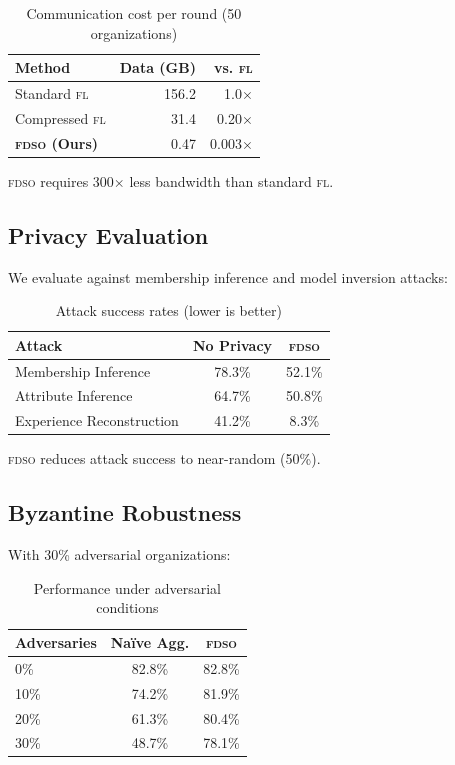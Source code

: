 \documentclass[11pt,letterpaper]{article}
\newcommand{\FDSO}{\textsc{fdso}}
\newcommand{\FL}{\textsc{fl}}
\begin{document}
\begin{table}[h]
\centering
\caption{Communication cost per round (50 organizations)}
\label{tab:communication}
\begin{tabular}{lrr}
\toprule
\textbf{Method} & \textbf{Data (GB)} & \textbf{vs. \FL{}} \\
\midrule
Standard \FL{} & 156.2 & 1.0$\times$ \\
Compressed \FL{} & 31.4 & 0.20$\times$ \\
\textbf{\FDSO{} (Ours)} & 0.47 & 0.003$\times$ \\
\bottomrule
\end{tabular}
\end{table}

\FDSO{} requires 300$\times$ less bandwidth than standard \FL{}.

\subsection{Privacy Evaluation}

We evaluate against membership inference and model inversion attacks:

\begin{table}[h]
\centering
\caption{Attack success rates (lower is better)}
\label{tab:privacy}
\begin{tabular}{lcc}
\toprule
\textbf{Attack} & \textbf{No Privacy} & \textbf{\FDSO{}} \\
\midrule
Membership Inference & 78.3\% & 52.1\% \\
Attribute Inference & 64.7\% & 50.8\% \\
Experience Reconstruction & 41.2\% & 8.3\% \\
\bottomrule
\end{tabular}
\end{table}

\FDSO{} reduces attack success to near-random (50\%).

\subsection{Byzantine Robustness}

With 30\% adversarial organizations:

\begin{table}[h]
\centering
\caption{Performance under adversarial conditions}
\label{tab:adversarial}
\begin{tabular}{lcc}
\toprule
\textbf{Adversaries} & \textbf{Na\"ive Agg.} & \textbf{\FDSO{}} \\
\midrule
0\% & 82.8\% & 82.8\% \\
10\% & 74.2\% & 81.9\% \\
20\% & 61.3\% & 80.4\% \\
30\% & 48.7\% & 78.1\% \\
\bottomrule
\end{tabular}
\end{table}
\end{document}
